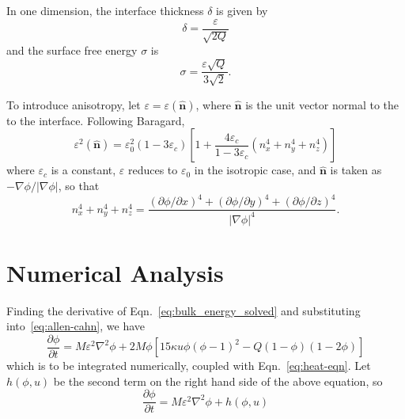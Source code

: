 \documentclass{article}
\renewcommand\l{\mathopen{}\left}
\renewcommand\r{\right}
\newcommand\abs[1]{\l\vert #1 \r\vert}
\newcommand\grad[1]{\nabla #1}
\newcommand\lap[1]{\nabla^2 #1}
\let\epsilon\varepsilon
\renewcommand\vec[1]{\bm{#1}}
\newcommand\unit[1]{\hat{\vec{#1}}}
\begin{document}
In one dimension, the interface thickness $\delta$ is given by
\begin{equation*}
  \delta = \frac{\epsilon}{\sqrt{2 Q}}
\end{equation*}
and the surface free energy $\sigma$ is
\begin{equation*}
  \sigma = \frac{\epsilon \sqrt{Q}}{3 \sqrt{2}}.
\end{equation*}

To introduce anisotropy, let $\epsilon = \epsilon(\unit{n})$, where
$\unit{n}$ is the unit vector normal to the to the interface.
Following Baragard,
\begin{equation*}
  \epsilon^2\l( \unit n \r)
    = \epsilon_0^2
        \l( 1 - 3 \epsilon_c \r)
        \l[
          1  + \frac{4 \epsilon_c}{1 - 3 \epsilon_c}
          \l(
            n_x^4 + n_y^4 + n_z^4
          \r)
        \r]
\end{equation*}
where $\epsilon_c$ is a constant, $\epsilon$ reduces to $\epsilon_0$
in the isotropic case, and $\unit n$ is
taken as $- \grad \phi / \abs{ \grad \phi }$, so that
\begin{equation*}
  n_x^4 + n_y^4 + n_z^4 =
  \frac{
    \l( \partial \phi / \partial x \r)^4 +
    \l( \partial \phi / \partial y \r)^4 +
    \l( \partial \phi / \partial z \r)^4
  }{
    \abs{ \grad \phi }^4
  }.
\end{equation*}

\section{Numerical Analysis} 
Finding the derivative of Eqn.~\eqref{eq:bulk_energy_solved} and
substituting into~\eqref{eq:allen-cahn}, we have
\begin{equation*}
  \frac {\partial \phi }{ \partial t } =
  M \epsilon^2 \lap{\phi} +
  2 M \phi \l[ 
    15 \kappa u \phi \l( \phi - 1 \r)^2 -
    Q \l( 1 - \phi \r) \l( 1 - 2 \phi \r)
  \r]
\end{equation*}
which is to be integrated numerically, coupled with
Eqn.~\eqref{eq:heat-eqn}. Let $h\l( \phi, u \r)$ be the second term
on the right hand side of the above equation, so
\begin{equation*}
  \frac {\partial \phi }{ \partial t }
  = M \epsilon^2 \lap{\phi} + h\l( \phi, u \r)
\end{equation*}
\end{document}
